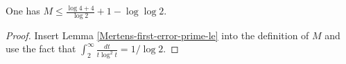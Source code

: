 \begin{corollary}
\label{Mertens-second-constant-prime-le}
\leanok
One has $M \leq \frac{\log 4 + 4}{\log 2} + 1 - \log \log 2$.
\end{corollary}
\begin{proof}
\leanok
Insert Lemma \ref{Mertens-first-error-prime-le} into the definition of $M$ and use the fact that $\int_2^\infty \frac{dt}{t \log^2 t} = 1/\log 2$.
\end{proof}

